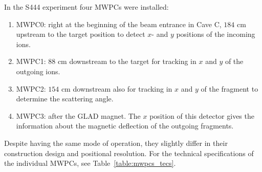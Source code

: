In the S444 experiment four MWPCs were installed:\newline
\begin{enumerate}
\item MWPC0: right at the beginning of the beam entrance in Cave C, $184$ cm upstream to the target position to detect $x$- and $y$ positions of the incoming ions.
\item MWPC1: $88$ cm downstream to the target for tracking in $x$ and $y$ of the outgoing ions.
\item MWPC2: $154$ cm downstream also for tracking in $x$ and $y$ of the fragment to determine the scattering angle.
\item MWPC3: after the GLAD magnet. The $x$ position of this detector gives the information about the magnetic deflection of the outgoing fragments.  %
\end{enumerate}
Despite having the same mode of operation, they slightly differ in their construction design and positional resolution. For the technical specifications of the individual MWPCs, see Table~\ref{table:mwpcs_tecs}.
